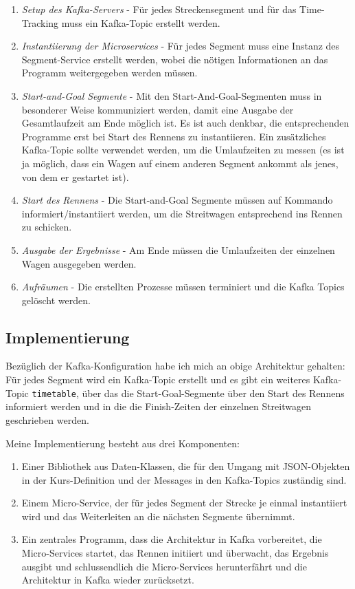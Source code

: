 \documentclass[12pt]{article}
\begin{document}
\begin{enumerate}
	\item \emph{Setup des Kafka-Servers} - Für jedes Streckensegment und für das Time-Tracking muss ein Kafka-Topic erstellt werden.
	\item \emph{Instantiierung der Microservices} - Für jedes Segment muss eine Instanz des Segment-Service erstellt werden, wobei die nötigen Informationen an das Programm weitergegeben werden müssen.
	\item \emph{Start-and-Goal Segmente} - Mit den Start-And-Goal-Segmenten muss in besonderer Weise kommuniziert werden, damit eine Ausgabe der Gesamtlaufzeit am Ende möglich ist.
	Es ist auch denkbar, die entsprechenden Programme erst bei Start des Rennens zu instantiieren.
	Ein zusätzliches Kafka-Topic sollte verwendet werden, um die Umlaufzeiten zu messen (es ist ja möglich, dass ein Wagen auf einem anderen Segment ankommt als jenes, von dem er gestartet ist).
	\item \emph{Start des Rennens} - Die Start-and-Goal Segmente müssen auf Kommando informiert/instantiiert werden, um die Streitwagen entsprechend ins Rennen zu schicken.
	\item \emph{Ausgabe der Ergebnisse} - Am Ende müssen die Umlaufzeiten der einzelnen Wagen ausgegeben werden.
	\item \emph{Aufräumen} - Die erstellten Prozesse müssen terminiert und die Kafka Topics gelöscht werden.
\end{enumerate}

\subsection*{Implementierung}
Bezüglich der Kafka-Konfiguration habe ich mich an obige Architektur gehalten: Für jedes Segment wird ein Kafka-Topic erstellt und es gibt ein weiteres Kafka-Topic \texttt{timetable}, über das die Start-Goal-Segmente über den Start des Rennens informiert werden und in die die Finish-Zeiten der einzelnen Streitwagen geschrieben werden.

Meine Implementierung besteht aus drei Komponenten: 
\begin{enumerate}
	\item Einer Bibliothek aus Daten-Klassen, die für den Umgang mit JSON-Objekten in der Kurs-Definition und der Messages in den Kafka-Topics zuständig sind.
	\item Einem Micro-Service, der für jedes Segment der Strecke je einmal instantiiert wird und das Weiterleiten an die nächsten Segmente übernimmt.
	\item Ein zentrales Programm, dass die Architektur in Kafka vorbereitet, die Micro-Services startet, das Rennen initiiert und überwacht, das Ergebnis ausgibt und schlussendlich die Micro-Services herunterfährt und die Architektur in Kafka wieder zurücksetzt.
\end{enumerate}
\end{document}
